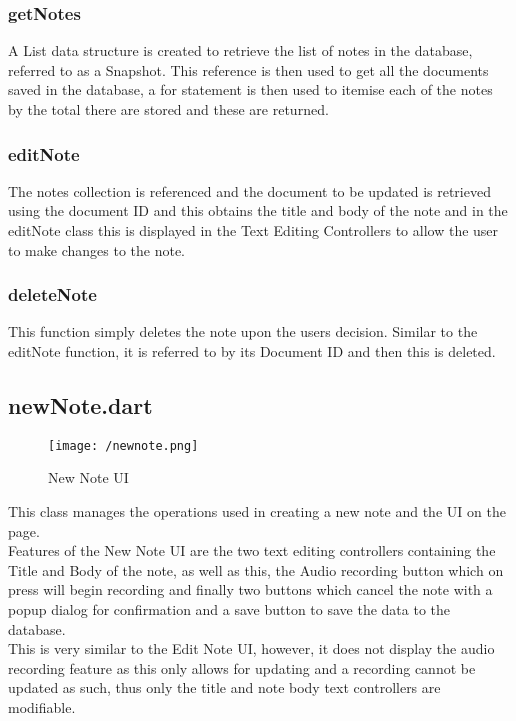 \documentclass{report}
\begin{document}
			\subsubsection{getNotes}
			A List data structure is created to retrieve the list of notes in the database, referred to as a Snapshot. This reference is then used to get all the documents saved in the database, a for statement is then used to itemise each of the notes by the total there are stored and these are returned.

			\subsubsection{editNote}
			The notes collection is referenced and the document to be updated is retrieved using the document ID and this obtains the title and body of the note and in the editNote class this is displayed in the Text Editing Controllers to allow the user to make changes to the note.

			\subsubsection{deleteNote}
			This function simply deletes the note upon the users decision. Similar to the editNote function, it is referred to by its Document ID and then this is deleted.

		\subsection{newNote.dart}
		\begin{figure}[H]
			\begin{center}
	 		 	\texttt{[image: /newnote.png]}
			\end{center}
			\caption[New Note UI]{New Note UI}
		\end{figure}
		This class manages the operations used in creating a new note and the UI on the page.\\

Features of the New Note UI are the two text editing controllers containing the Title and Body of the note, as well as this, the Audio recording button which on press will begin recording and finally two buttons which cancel the note with a popup dialog for confirmation and a save button to save the data to the database.\\

This is very similar to the Edit Note UI, however, it does not display the audio recording feature as this only allows for updating and a recording cannot be updated as such, thus only the title and note body text controllers are modifiable.
\end{document}
